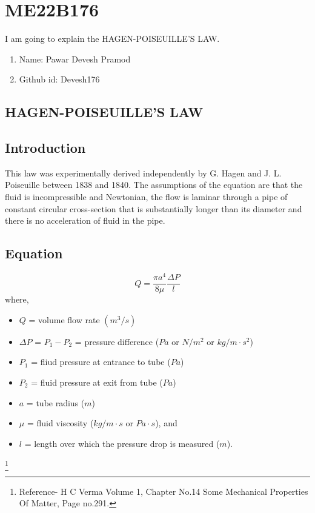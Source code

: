 \section{ME22B176}
I am going to explain the HAGEN-POISEUILLE'S LAW.
\begin{enumerate}
\item Name: Pawar Devesh Pramod
\item Github id: Devesh176
\end{enumerate}
\subsection{HAGEN-POISEUILLE'S LAW}
\subsection{Introduction}
This law was experimentally derived independently by G. Hagen and J. L. Poiseuille between 1838 and 1840. The assumptions of the equation are that the fluid is incompressible and Newtonian, the flow is laminar through a pipe of constant circular cross-section that is substantially longer than its diameter and there is no acceleration of fluid in the pipe.
\subsection{Equation}
\begin{equation}
    Q = \frac{\pi a^{4}}{8\mu} \frac{\Delta P}{l}
\end{equation}
where,
\begin{itemize}
\item $Q$ = volume flow rate $(m^{3}/s)$
\item $\Delta P$ = $P_{1} - P_{2}$ = pressure difference ($Pa$ or $N/m^{2}$ or $kg/m \cdot s^{2}$)
\item $P_{1}$ = fliud pressure at entrance to tube ($Pa$)
\item $P_{2}$ = fluid pressure at exit from tube ($Pa$)
\item $a$ = tube radius ($m$)
\item $\mu$ = fluid viscosity ($kg/m \cdot s$ or $Pa \cdot s$), and
\item $l$ = length over which the pressure drop is measured ($m$).
\end{itemize}
\footnote{Reference- H C Verma Volume 1, Chapter No.14 Some Mechanical Properties Of Matter, Page no.291.}
